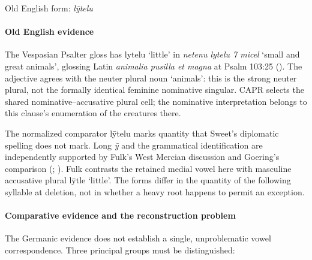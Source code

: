 \documentclass[
  british,
  a4paper,
]{article}
\begin{document}
Old English form: \emph{lȳtelu}

\paragraph{Old English evidence}\label{old-english-evidence-47}

The Vespasian Psalter gloss has {lytelu} `little' in \emph{netenu lytelu
7 micel} `small and great animals', glossing Latin \emph{animalia
pusilla et magna} at Psalm 103:25 (). The adjective agrees with the neuter plural noun `animals': this
is the strong neuter plural, not the formally identical feminine
nominative singular. CAPR selects the shared nominative--accusative
plural cell; the nominative interpretation belongs to this clause's
enumeration of the creatures there.

The normalized comparator {lȳtelu} marks quantity that Sweet's
diplomatic spelling does not mark. Long \emph{ȳ} and the grammatical
identification are independently supported by Fulk's West Mercian
discussion and Goering's comparison (; ). Fulk
contrasts the retained medial vowel here with masculine accusative
plural {lȳtle} `little'. The forms differ in the quantity of the
following syllable at deletion, not in whether a heavy root happens to
permit an exception.

\paragraph{Comparative evidence and the reconstruction
problem}\label{comparative-evidence-and-the-reconstruction-problem}

The Germanic evidence does not establish a single, unproblematic vowel
correspondence. Three principal groups must be distinguished:
\end{document}
